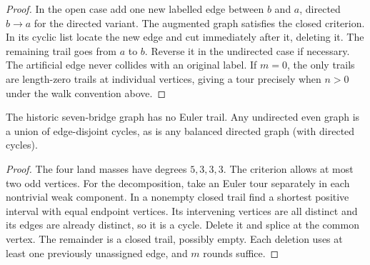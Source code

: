 \begin{proof}
In the open case add one new labelled edge between $b$ and $a$, directed $b\to a$ for the directed variant. The augmented graph satisfies the closed criterion. In its cyclic list locate the new edge and cut immediately after it, deleting it. The remaining trail goes from $a$ to $b$. Reverse it in the undirected case if necessary. The artificial edge never collides with an original label. If $m=0$, the only trails are length-zero trails at individual vertices, giving a tour precisely when $n>0$ under the walk convention above.
\end{proof}

\begin{corollary}\leavevmode\label{stkonigsberg}
The historic seven-bridge graph has no Euler trail. Any undirected even graph is a union of edge-disjoint cycles, as is any balanced directed graph (with directed cycles).
\end{corollary}
\begin{proof}
The four land masses have degrees $5,3,3,3$. The criterion allows at most two odd vertices. For the decomposition, take an Euler tour separately in each nontrivial weak component. In a nonempty closed trail find a shortest positive interval with equal endpoint vertices. Its intervening vertices are all distinct and its edges are already distinct, so it is a cycle. Delete it and splice at the common vertex. The remainder is a closed trail, possibly empty. Each deletion uses at least one previously unassigned edge, and $m$ rounds suffice.
\end{proof}

